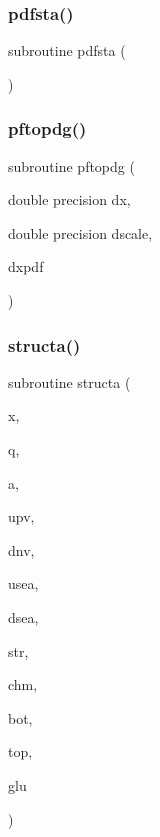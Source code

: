 \mbox{\label{lhaglue_8f_ac540d75e892d266bf9f81c2278314d30}} 
\subsubsection{\texorpdfstring{pdfsta()}{pdfsta()}}
{\footnotesize\ttfamily subroutine pdfsta (\begin{DoxyParamCaption}{ }\end{DoxyParamCaption})}

\mbox{\label{lhaglue_8f_a3ac5221acf946b2057ae65d0bd9b607a}} 
\subsubsection{\texorpdfstring{pftopdg()}{pftopdg()}}
{\footnotesize\ttfamily subroutine pftopdg (\begin{DoxyParamCaption}\item[{double precision}]{dx,  }\item[{double precision}]{dscale,  }\item[{}]{dxpdf }\end{DoxyParamCaption})}

\mbox{\label{lhaglue_8f_affbeec06ae9e7c00e46b28b8dce5d1d5}} 
\subsubsection{\texorpdfstring{structa()}{structa()}}
{\footnotesize\ttfamily subroutine structa (\begin{DoxyParamCaption}\item[{}]{x,  }\item[{}]{q,  }\item[{}]{a,  }\item[{}]{upv,  }\item[{}]{dnv,  }\item[{}]{usea,  }\item[{}]{dsea,  }\item[{}]{str,  }\item[{}]{chm,  }\item[{}]{bot,  }\item[{}]{top,  }\item[{}]{glu }\end{DoxyParamCaption})}

